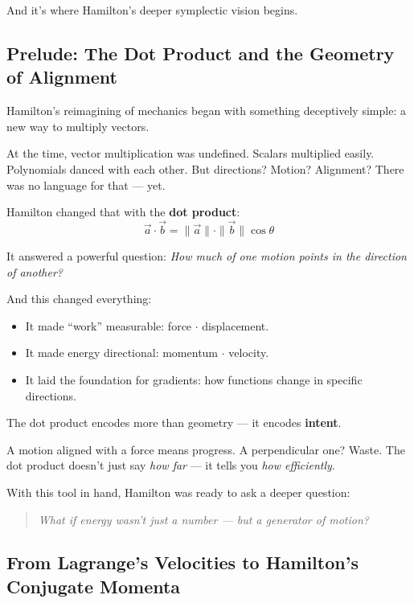 And it’s where Hamilton’s deeper symplectic vision begins.
\subsection{Prelude: The Dot Product and the Geometry of Alignment}

Hamilton’s reimagining of mechanics began with something deceptively simple: a new way to multiply vectors.

At the time, vector multiplication was undefined. Scalars multiplied easily. Polynomials danced with each other. But directions? Motion? Alignment? There was no language for that — yet.

Hamilton changed that with the \textbf{dot product}:
\[
\vec{a} \cdot \vec{b} = \|\vec{a}\| \cdot \|\vec{b}\| \cos \theta
\]

It answered a powerful question:  
\textit{How much of one motion points in the direction of another?}

And this changed everything:
\begin{itemize}
    \item It made “work” measurable: force $\cdot$ displacement.
    \item It made energy directional: momentum $\cdot$ velocity.
    \item It laid the foundation for gradients: how functions change in specific directions.
\end{itemize}

\begin{tcolorbox}[colback=blue!5!white, colframe=blue!50!black, title={Sidebar: Alignment as Information}]
    The dot product encodes more than geometry — it encodes \textbf{intent}.  

    A motion aligned with a force means progress. A perpendicular one? Waste.  
    The dot product doesn’t just say \emph{how far} — it tells you \emph{how efficiently}.
\end{tcolorbox}

With this tool in hand, Hamilton was ready to ask a deeper question:

\begin{quote}
    \emph{What if energy wasn't just a number — but a generator of motion?}
\end{quote}

\subsection{From Lagrange’s Velocities to Hamilton’s Conjugate Momenta}

